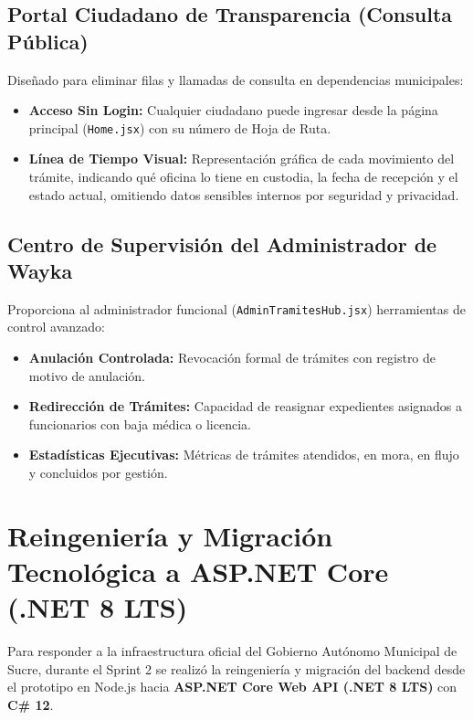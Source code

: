 \documentclass[a4paper,12pt]{article}
\newcommand{\dotnet}{\mbox{.NET}}
\begin{document}
\subsection{Portal Ciudadano de Transparencia (Consulta Pública)}
Diseñado para eliminar filas y llamadas de consulta en dependencias municipales:
\begin{itemize}[leftmargin=1.5em]
    \item \textbf{Acceso Sin Login:} Cualquier ciudadano puede ingresar desde la página principal (\texttt{Home.jsx}) con su número de Hoja de Ruta.
    \item \textbf{Línea de Tiempo Visual:} Representación gráfica de cada movimiento del trámite, indicando qué oficina lo tiene en custodia, la fecha de recepción y el estado actual, omitiendo datos sensibles internos por seguridad y privacidad.
\end{itemize}

\subsection{Centro de Supervisión del Administrador de Wayka}
Proporciona al administrador funcional (\texttt{AdminTramitesHub.jsx}) herramientas de control avanzado:
\begin{itemize}[leftmargin=1.5em]
    \item \textbf{Anulación Controlada:} Revocación formal de trámites con registro de motivo de anulación.
    \item \textbf{Redirección de Trámites:} Capacidad de reasignar expedientes asignados a funcionarios con baja médica o licencia.
    \item \textbf{Estadísticas Ejecutivas:} Métricas de trámites atendidos, en mora, en flujo y concluidos por gestión.
\end{itemize}

\section{Reingeniería y Migración Tecnológica a ASP\dotnet{} Core (\dotnet{} 8 LTS)}

Para responder a la infraestructura oficial del Gobierno Autónomo Municipal de Sucre, durante el Sprint 2 se realizó la reingeniería y migración del backend desde el prototipo en Node.js hacia \textbf{ASP\dotnet{} Core Web API (\dotnet{} 8 LTS)} con \textbf{C\# 12}.
\end{document}
